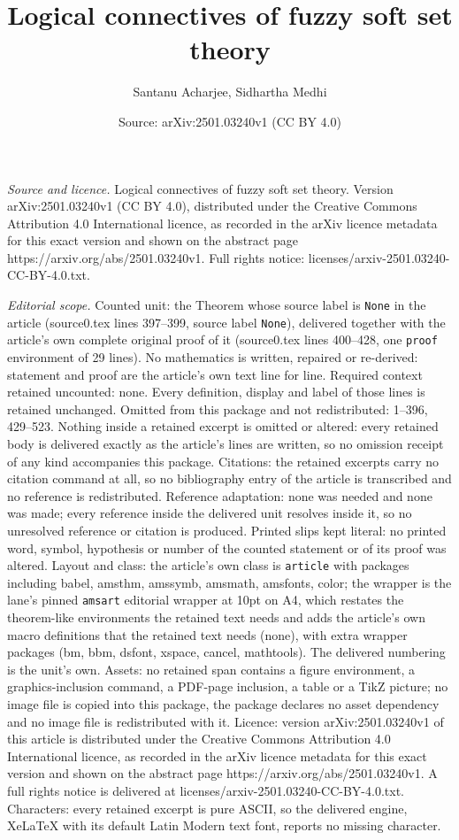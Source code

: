 \documentclass[10pt,a4paper]{amsart}
\title[Logical connectives of fuzzy soft set theory]{Logical connectives of fuzzy soft set theory}
\author{Santanu Acharjee, Sidhartha Medhi}
\date{Source: arXiv:2501.03240v1 (CC BY 4.0)}
\begin{document}
\maketitle

\noindent\emph{Source and licence.} Logical connectives of fuzzy soft set theory. Version arXiv:2501.03240v1 (CC BY 4.0), distributed under the Creative Commons Attribution 4.0 International licence, as recorded in the arXiv licence metadata for this exact version and shown on the abstract page https://arxiv.org/abs/2501.03240v1. Full rights notice: licenses/arxiv-2501.03240-CC-BY-4.0.txt.\par\smallskip

\noindent\textit{Editorial scope.} Counted unit: the Theorem whose source label is \texttt{None} in the article (source0.tex lines 397--399, source label \texttt{None}), delivered together with the article's own complete original proof of it (source0.tex lines 400--428, one \texttt{proof} environment of 29 lines). No mathematics is written, repaired or re-derived: statement and proof are the article's own text line for line. Required context retained uncounted: none. Every definition, display and label of those lines is retained unchanged. Omitted from this package and not redistributed: 1--396, 429--523. Nothing inside a retained excerpt is omitted or altered: every retained body is delivered exactly as the article's lines are written, so no omission receipt of any kind accompanies this package. Citations: the retained excerpts carry no citation command at all, so no bibliography entry of the article is transcribed and no reference is redistributed. Reference adaptation: none was needed and none was made; every reference inside the delivered unit resolves inside it, so no unresolved reference or citation is produced. Printed slips kept literal: no printed word, symbol, hypothesis or number of the counted statement or of its proof was altered. Layout and class: the article's own class is \texttt{article} with packages including babel, amsthm, amssymb, amsmath, amsfonts, color; the wrapper is the lane's pinned \texttt{amsart} editorial wrapper at 10pt on A4, which restates the theorem-like environments the retained text needs and adds the article's own macro definitions that the retained text needs (none), with extra wrapper packages (bm, bbm, dsfont, xspace, cancel, mathtools). The delivered numbering is the unit's own. Assets: no retained span contains a figure environment, a graphics-inclusion command, a PDF-page inclusion, a table or a TikZ picture; no image file is copied into this package, the package declares no asset dependency and no image file is redistributed with it. Licence: version arXiv:2501.03240v1 of this article is distributed under the Creative Commons Attribution 4.0 International licence, as recorded in the arXiv licence metadata for this exact version and shown on the abstract page https://arxiv.org/abs/2501.03240v1. A full rights notice is delivered at licenses/arxiv-2501.03240-CC-BY-4.0.txt. Characters: every retained excerpt is pure ASCII, so the delivered engine, XeLaTeX with its default Latin Modern text font, reports no missing character.
\end{document}
